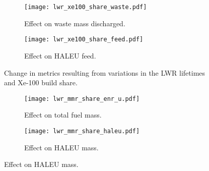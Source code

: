 \begin{figure}
    \ContinuedFloat    
    \begin{subfigure}[b]{0.48\textwidth}
        \centering
        \texttt{[image: lwr\_xe100\_share\_waste.pdf]}
        \caption{Effect on waste mass discharged.}
        \label{fig:lwr_xe100_share_waste}
    \end{subfigure}
    \hfill
    \begin{subfigure}[b]{0.48\textwidth}
        \centering
        \texttt{[image: lwr\_xe100\_share\_feed.pdf]}
        \caption{Effect on HALEU feed.}
        \label{fig:lwr_xe100_share_feed}
    \end{subfigure}
    \caption{Change in metrics resulting from variations in the 
    LWR lifetimes and Xe-100 build share.}
    \label{fig:lwr_xe100_share}
\end{figure}

\begin{figure}
    \begin{subfigure}[b]{0.48\textwidth}
        \centering
        \texttt{[image: lwr\_mmr\_share\_enr\_u.pdf]}
        \caption{Effect on total fuel mass.}
        \label{fig:lwr_mmr_share_enr_u}
    \end{subfigure}
    \hfill
    \begin{subfigure}[b]{0.48\textwidth}
        \centering
        \texttt{[image: lwr\_mmr\_share\_haleu.pdf]}
        \caption{Effect on HALEU mass.}
        \label{fig:lwr_mmr_share_haleu}
    \end{subfigure}
\end{figure}

